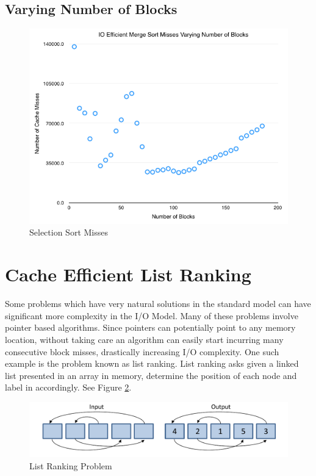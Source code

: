 \documentclass[11pt]{article}
\begin{document}
\subsection{Varying Number of Blocks}

\begin{figure}[H]  
\includegraphics[scale=0.45]{figures/NumBlocks_IOEfficientMergeSort.png}
\caption{Selection Sort Misses}
\label{listrankingio}
\end{figure}


\section{Cache Efficient List Ranking}
Some problems which have very natural solutions in the standard model can have significant more complexity in the I/O Model. 
Many of these problems involve pointer based algorithms.  Since pointers can potentially point to any memory location, without 
taking care an algorithm can easily start incurring many consecutive block misses, drastically increasing I/O complexity.  One 
such example is the problem known as list ranking.  List ranking asks given a linked list presented in an array in memory, determine 
the position of each node and label in accordingly.  See Figure  \ref{listrankingio}.

\begin{figure}[H]  
\includegraphics[scale=0.5]{figures/listrankingio.pdf}
\caption{List Ranking Problem}
\label{listrankingio}
\end{figure}
\end{document}

